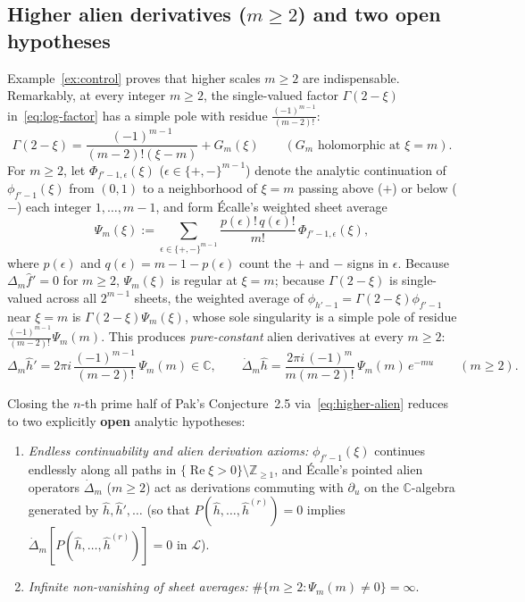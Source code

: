 \documentclass[10pt,reqno]{amsart}
\numberwithin{equation}{section}
\theoremstyle{definition}
\newcommand{\Z}{\mathbb{Z}}
\newcommand{\C}{\mathbb{C}}
\newcommand{\cL}{\mathcal{L}}
\DeclareMathOperator{\RePart}{Re}
\renewcommand{\Re}{\RePart}
\begin{document}
\subsection{Higher alien derivatives (\texorpdfstring{$m \ge 2$}{m >= 2}) and two open hypotheses}
Example~\ref{ex:control} proves that higher scales $m \ge 2$ are indispensable. Remarkably, at every integer $m \ge 2$, the single-valued factor $\Gamma(2 - \xi)$ in~\eqref{eq:log-factor} has a simple pole with residue $\frac{(-1)^{m-1}}{(m-2)!}$:
\[
  \Gamma(2 - \xi) = \frac{(-1)^{m-1}}{(m - 2)!(\xi - m)} + G_m(\xi) \qquad (G_m \text{ holomorphic at } \xi = m).
\]
For $m \ge 2$, let $\Phi_{f'-1,\epsilon}(\xi)$ ($\epsilon \in \{+,-\}^{m-1}$) denote the analytic continuation of $\phi_{f'-1}(\xi)$ from $(0,1)$ to a neighborhood of $\xi = m$ passing above ($+$) or below ($-$) each integer $1, \dots, m - 1$, and form \'Ecalle's weighted sheet average
\[
  \Psi_m(\xi) := \sum_{\epsilon \in \{+,-\}^{m-1}} \frac{p(\epsilon)!\, q(\epsilon)!}{m!}\, \Phi_{f'-1,\epsilon}(\xi),
\]
where $p(\epsilon)$ and $q(\epsilon) = m - 1 - p(\epsilon)$ count the $+$ and $-$ signs in $\epsilon$. Because $\Delta_m \widehat{f}' = 0$ for $m \ge 2$, $\Psi_m(\xi)$ is regular at $\xi = m$; because $\Gamma(2-\xi)$ is single-valued across all $2^{m-1}$ sheets, the weighted average of $\phi_{h'-1} = \Gamma(2-\xi)\phi_{f'-1}$ near $\xi = m$ is $\Gamma(2-\xi)\Psi_m(\xi)$, whose sole singularity is a simple pole of residue $\frac{(-1)^{m-1}}{(m-2)!}\Psi_m(m)$. This produces \emph{pure-constant} alien derivatives at every $m \ge 2$:
\begin{equation}\label{eq:higher-alien}
  \Delta_m \widehat{h}' = 2\pi i\,\frac{(-1)^{m-1}}{(m - 2)!}\,\Psi_m(m) \in \C, \qquad
  \dot{\Delta}_m \widehat{h} = \frac{2\pi i\,(-1)^m}{m(m - 2)!}\,\Psi_m(m)\, e^{-mu} \qquad (m \ge 2).
\end{equation}

Closing the $n$-th prime half of Pak's Conjecture~2.5 via~\eqref{eq:higher-alien} reduces to two explicitly \textbf{open} analytic hypotheses:
\begin{enumerate}[\textbf{(H1)}]
  \item \emph{Endless continuability and alien derivation axioms:} $\phi_{f'-1}(\xi)$ continues endlessly along all paths in $\{\Re\xi > 0\} \setminus \Z_{\ge 1}$, and \'Ecalle's pointed alien operators $\dot{\Delta}_m$ ($m \ge 2$) act as derivations commuting with $\partial_u$ on the $\C$-algebra generated by $\widehat{h}, \widehat{h}', \dots$ (so that $P(\widehat{h}, \dots, \widehat{h}^{(r)}) = 0$ implies $\dot{\Delta}_m[P(\widehat{h}, \dots, \widehat{h}^{(r)})] = 0$ in $\cL$).
  \item \emph{Infinite non-vanishing of sheet averages:} $\#\{m \ge 2 : \Psi_m(m) \neq 0\} = \infty$.
\end{enumerate}
\end{document}
